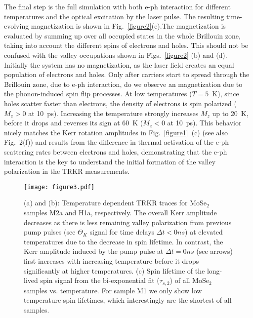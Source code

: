 \documentclass[prb,aps,superscriptaddress,reprint]{revtex4-1}
\begin{document}
The final step is the full simulation with both e-ph interaction for different temperatures and the optical excitation by the laser pulse. The resulting time-evolving magnetization is shown in Fig.~\ref{figure2}(e).The magnetization is evaluated by summing up over all occupied states in the whole Brillouin zone, taking into account the different spins of electrons and holes. This should not be confused with the valley occupations shown in Figs.~\ref{figure2} (b) and (d).
Initially the system has no magnetization, as the laser field creates an equal population of electrons and holes. Only after carriers start to spread through the Brillouin zone, due to e-ph interaction, do we observe an magnetization due to the phonon-induced spin flip processes. At low temperatures ($T=5$~K), since holes scatter faster than electrons, the density of electrons is spin polarized ($M_z>0$ at 10~ps). Increasing the temperature strongly increases $M_z$ up to 20~K, before it drops and reverses its sign at 60~K ($M_z<0$ at 10~ps). This behavior nicely matches the Kerr rotation amplitudes in Fig.~\ref{figure1}~(c) (see also Fig.~2(f)) and results from the difference in thermal activation of the e-ph scattering rates between electrons and holes, demonstrating that the e-ph interaction is the key to understand the initial formation of the valley polarization in the TRKR measurements. 




\begin{figure*}[tb]
		\texttt{[image: figure3.pdf]}
	\caption{(a) and (b): Temperature dependent TRKR traces for MoSe$_2$ samples M2a and H1a, respectively. The overall Kerr amplitude decreases as there is less remaining valley polarization from previous pump pulses (see $\Theta_K$ signal for time delays $\Delta t < \unit{0}{ns}$) at elevated temperatures due to the decrease in spin lifetime. In contrast, the Kerr amplitude induced by the pump pulse at $\Delta t = \unit{0}{ns}$ (see arrows) first increases with increasing temperature before it drops significantly at higher temperatures. (c) Spin lifetime of the long-lived spin signal from the bi-exponential fit ($\tau_{s,2}$) of all MoSe$_2$ samples vs. temperature. For sample M1 we only show low temperature spin lifetimes, which interestingly are the shortest of all samples.}
	\label{figure3}
\end{figure*}
\end{document}
